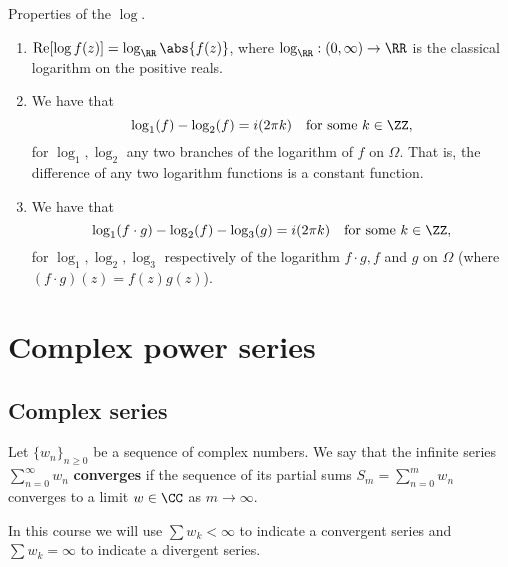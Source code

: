 \documentclass[12pt, a4paper]{article}
\DeclareMathOperator{\R}{Re}
\begin{document}
\begin{proposition}
    Properties of the \(\log\).
    \begin{enumerate}
        \item \(\R[\log f(z)] = \log_{\RR}\abs{f(z)}\), where \(\log_{\RR} : (0,\infty) \to \RR\) is  the classical logarithm on the positive reals.
        \item We have that 
        \[\log_1(f)-\log_2(f) = i(2\pi k) \quad \text{for some } k \in \ZZ,\]
        for \(\log_1,\log_2\) any two branches of the logarithm of \(f\) on \(\Omega\). That is, the difference of any two logarithm functions is a constant function.
        \item We have that 
        \[\log_1(f\cdot g)-\log_2(f)-\log_3(g)=i(2\pi k) \quad \text{for some } k \in \ZZ,\]
        for \(\log_1,\log_2,\log_3\) respectively of the logarithm \(f \cdot g, f\) and \(g\) on \(\Omega\) (where \((f\cdot g)(z)= f(z)g(z)\)).
    \end{enumerate}
\end{proposition}


\section{Complex power series}

\subsection{Complex series}

\begin{definition}
    Let \(\{w_n\}_{n \geq 0}\) be a sequence of complex numbers. We say that the infinite series \(\sum_{n=0}^{\infty} w_n\) \textbf{converges} if the sequence of its partial sums \(S_m = \sum_{n=0}^{m} w_n\) converges to a limit \(w \in \CC\) as \(m \to \infty\).
\end{definition}

\begin{mdremark}
    In this course we will use \(\sum w_k < \infty\) to indicate a convergent series and \(\sum w_k = \infty\) to indicate a divergent series.
\end{mdremark}
\end{document}
